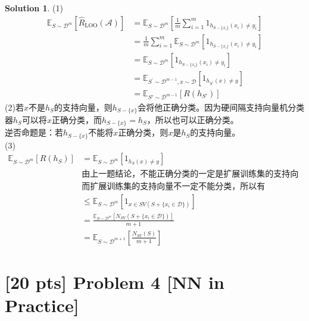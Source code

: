 \documentclass[a4paper,UTF8]{article}
\theoremstyle{definition}
\newtheorem*{solution}{Solution}
\begin{document}
\begin{solution}
(1)
\begin{equation*}
	\begin{split}
		\mathbb{E}_{S \sim \mathcal{D}^m} [ \hat{R}_{\text{LOO} }(\mathcal{A}) ]&=\mathbb{E}_{S \sim \mathcal{D}^m} [ \frac{1}{m}\sum_{i=1}^m 1_{h_{S-\{x_i\}}(x_i)\neq y_i} ]\\
		&=\frac{1}{m}\sum_{i=1}^m \mathbb{E}_{S \sim \mathcal{D}^m} [1_{h_{S-\{x_i\}}(x_i)\neq y_i}]\\
		&=\mathbb{E}_{S \sim \mathcal{D}^m} [1_{h_{S-\{x_i\}}(x_i)\neq y_i}]\\
		&=\mathbb{E}_{S^\prime \sim \mathcal{D}^{m-1},x \sim \mathcal{D}} [1_{h_{S^\prime}(x)\neq y}]\\
		&=\mathbb{E}_{S' \sim \mathcal{D}^{m-1}} [ R(h_{S'}) ]
	\end{split}
\end{equation*}
(2)若$x$不是$h_S$的支持向量，则$h_{S-\{x\}}$会将他正确分类。因为硬间隔支持向量机分类器$h_S$可以将$x$正确分类，而$h_{S-\{x\}}=h_S$，所以也可以正确分类。\\
逆否命题是：若$h_{S-\{x\}}$不能将$x$正确分类，则$x$是$h_S$的支持向量。\\
(3)
\begin{equation*}
	\begin{split}
		\mathbb{E}_{S \sim \mathcal{D}^m} [R(h_{S})] &= \mathbb{E}_{S \sim \mathcal{D}^m} [1_{h_S(x)\neq y}]\\
		&\text{由上一题结论，不能正确分类的一定是扩展训练集的支持向量，}\\
		&\text{而扩展训练集的支持向量不一定不能分类，所以有}\\
		&\le \mathbb{E}_{S \sim \mathcal{D}^{m}} [1_{x \in SV(S+\{x_i \in \mathcal{D}\})}]\\
		&=\frac{\mathbb{E}_{S \sim \mathcal{D}^{m}}[N_{SV}(S+\{x_i \in \mathcal{D}\})]}{m+1}\\
		&=\mathbb{E}_{S \sim \mathcal{D}^{m+1}} \left[ \frac{N_{SV}(S)}{m+1} \right]
	\end{split}
\end{equation*}
\end{solution}

\section*{[20 pts] Problem 4 [NN in Practice]}
\end{document}

